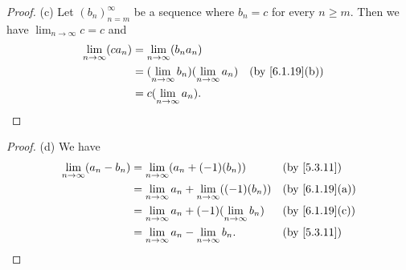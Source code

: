 \begin{proof}{(c)}
  Let \((b_n)_{n = m}^\infty\) be a sequence where \(b_n = c \) for every \(n \geq m\).
  Then we have \(\lim_{n \to \infty} c = c\) and
  \begin{align*}
    \lim_{n \to \infty} (c a_n) & = \lim_{n \to \infty} (b_n a_n)                                                        \\
                                & = (\lim_{n \to \infty} b_n)(\lim_{n \to \infty} a_n) &  & \text{(by \cref{6.1.19}(b))} \\
                                & = c(\lim_{n \to \infty} a_n).
  \end{align*}
\end{proof}

\begin{proof}{(d)}
  We have
  \begin{align*}
    \lim_{n \to \infty} (a_n - b_n) & = \lim_{n \to \infty} (a_n + (-1)(b_n))                     &  & \text{(by \cref{5.3.11})}    \\
                                    & = \lim_{n \to \infty} a_n + \lim_{n \to \infty} ((-1)(b_n)) &  & \text{(by \cref{6.1.19}(a))} \\
                                    & = \lim_{n \to \infty} a_n + (-1)(\lim_{n \to \infty} b_n)   &  & \text{(by \cref{6.1.19}(c))} \\
                                    & = \lim_{n \to \infty} a_n - \lim_{n \to \infty} b_n.        &  & \text{(by \cref{5.3.11})}
  \end{align*}
\end{proof}

